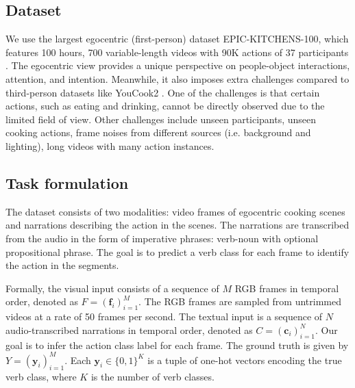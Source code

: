 \documentclass[11pt,a4paper]{article}
\begin{document}
\subsection{Dataset}
We use the largest egocentric (first-person) dataset  EPIC-KITCHENS-100, which features 100 hours, 700 variable-length videos with 90K actions of 37 participants \cite{Damen2020RESCALING}. The egocentric view provides a unique perspective on people-object interactions, attention, and intention. Meanwhile, it also imposes extra challenges compared to third-person datasets like YouCook2 \cite{ZhXuCoAAAI18}. One of the challenges is that certain actions, such as eating and drinking, cannot be directly observed due to the limited field of view. Other challenges include unseen participants, unseen cooking actions, frame noises from different sources (i.e. background and lighting), long videos with many action instances.

\subsection{Task formulation}
The dataset consists of two modalities: video frames of egocentric cooking scenes and narrations describing the action in the scenes. The narrations are transcribed from the audio in the form of imperative phrases: verb-noun with optional propositional phrase. The goal is to predict a verb class for each frame to identify the action in the segments. 

Formally, the visual input consists of a sequence of $M$ RGB frames in temporal order, denoted as $F=(\mathbf{f}_i)_{i=1}^M$. The RGB frames are sampled from untrimmed videos at a rate of 50 frames per second. The textual input is a sequence of $N$ audio-transcribed narrations in temporal order, denoted as $C=(\mathbf{c}_i)_{i=1}^N$. Our goal is to infer the action class label for each frame. The ground truth is given by $Y=(\mathbf{y}_i)_{i=1}^M$. Each $\mathbf{y}_i\in\{0,1\}^K$ is a tuple of one-hot vectors encoding the true verb class, where $K$ is the number of verb classes.
\end{document}

